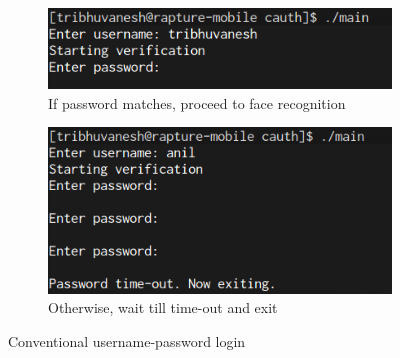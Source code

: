 \documentclass[12pt]{article}			%
\begin{document}
\begin{figure}[b]
        \begin{subfigure}[b]{0.6\textwidth}
                \centering
                \includegraphics[scale=0.4]{img/login.png}
                \caption{If password matches, proceed to face recognition}
                \label{fig:pwd1}
        \end{subfigure}%
        \begin{subfigure}[b]{0.5\textwidth}
                \centering
                \includegraphics[scale=0.35]{img/login2.png}
                \caption{Otherwise, wait till time-out and exit}
                \label{fig:pwd2}
        \end{subfigure}
        \caption{Conventional username-password login}\label{fig:pwd}
\end{figure}
\end{document}
